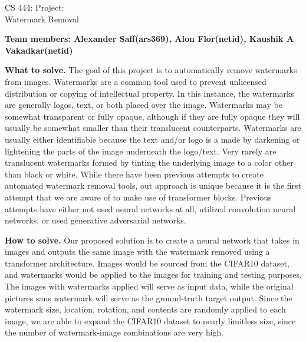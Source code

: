\documentclass[11pt]{article}
\begin{document}
\begin{center}
\large{CS 444: Project:\\Watermark Removal}\\
\end{center}
\vspace{5mm}

\textbf{Team members: Alexander Saff(ars369), Alon Flor(netid), Kaushik A Vakadkar(netid)}




\begin{sloppypar}
\textbf{What to solve.}
The goal of this project is to automatically remove watermarks from images. Watermarks are a common tool used to prevent unlicensed distribution or copying of intellectual property. In this instance, the watermarks are generally logos, text, or both placed over the image. Watermarks may be somewhat transparent or fully opaque, although if they are fully opaque they will usually be somewhat smaller than their translucent counterparts. Watermarks are usually either identifiable because the text and/or logo is a made by darkening or lightening the parts of the image underneath the logo/text. Very rarely are translucent watermarks formed by tinting the underlying image to a color other than black or white. While there have been previous attempts to create automated watermark removal tools, out approach is unique because it is the first attempt that we are aware of to make use of transformer blocks. \cite{transformer} Previous attempts have either not used neural networks at all, utilized convolution neural networks, or used generative adversarial networks.
\end{sloppypar}

\begin{sloppypar}
\textbf{How to solve.} 
Our proposed solution is to create a neural network that takes in images and outputs the same image with the watermark removed using a transformer architecture. Images would be sourced from the CIFAR10 dataset, and watermarks would be applied to the images for training and testing purposes. The images with watermarks applied will serve as input data, while the original pictures sans watermark will serve as the ground-truth target output. Since the watermark size, location, rotation, and contents are randomly applied to each image, we are able to expand the CIFAR10 dataset to nearly limitless size, since the number of watermark-image combinations are very high. 
\end{sloppypar}
\end{document}

